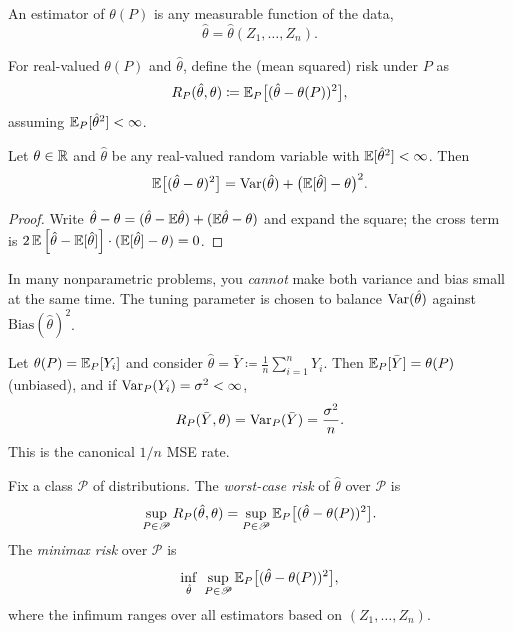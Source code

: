 \begin{definition}[Estimator]
	An estimator of $\theta(P)$ is any measurable function of the data,
	\[
		\hat\theta=\hat\theta(Z_1,\dots,Z_n).
	\]
\end{definition}

\begin{definition}
	For real-valued $\theta(P)$ and $\hat\theta$, define the (mean squared) risk under $P$ as
	\[
		R_P(\hat\theta,\theta)\coloneqq\mathbb{E}_P\big[(\hat\theta-\theta(P))^2\big],
	\]
	assuming $\mathbb{E}_P[\hat\theta^2]<\infty$.
\end{definition}

\begin{lemma}
	Let $\theta\in\mathbb{R}$ and $\hat\theta$ be any real-valued random variable with $\mathbb{E}[\hat\theta^2]<\infty$.
	Then
	\[
		\mathbb{E}\big[(\hat\theta-\theta)^2\big]
		=
		\operatorname{Var}(\hat\theta)+\big(\mathbb{E}[\hat\theta]-\theta\big)^2.
	\]
\end{lemma}


\begin{proof}
	Write $\hat\theta-\theta=(\hat\theta-\mathbb{E}\hat\theta)+(\mathbb{E}\hat\theta-\theta)$ and expand the square; the cross term is
	$2\,\mathbb{E}\left[\hat\theta-\mathbb{E}[\hat\theta]\right]\cdot(\mathbb{E}[\hat\theta]-\theta)=0$.
\end{proof}

\begin{remark}	In many nonparametric problems, you \emph{cannot} make both variance and bias small at the same time.
	The tuning parameter is chosen to balance $\operatorname{Var}(\hat\theta)$ against $\mathrm{Bias}(\hat\theta)^2$.
\end{remark}

\begin{example}
	Let $\theta(P)=\mathbb{E}_P[Y_i]$ and consider $\hat\theta=\bar Y\coloneqq\frac1n\sum_{i=1}^n Y_i$.
	Then $\mathbb{E}_P[\bar Y]=\theta(P)$ (unbiased), and if $\operatorname{Var}_P(Y_i)=\sigma^2<\infty$,
	\[
		R_P(\bar Y,\theta)
		=
		\operatorname{Var}_P(\bar Y)
		=
		\frac{\sigma^2}{n}.
	\]
	This is the canonical $1/n$ MSE rate.
\end{example}

\begin{definition}
	Fix a class $\mathscr P$ of distributions. The \emph{worst-case risk} of $\hat\theta$ over $\mathscr P$ is
	\[
		\sup_{P\in\mathscr P} R_P(\hat\theta,\theta)
		=
		\sup_{P\in\mathscr P}\mathbb{E}_P\big[(\hat\theta-\theta(P))^2\big].
	\]
	The \emph{minimax risk} over $\mathscr P$ is
	\[
		\inf_{\hat\theta}\ \sup_{P\in\mathscr P}\mathbb{E}_P\big[(\hat\theta-\theta(P))^2\big],
	\]
	where the infimum ranges over all estimators based on $(Z_1,\dots,Z_n)$.
\end{definition}

